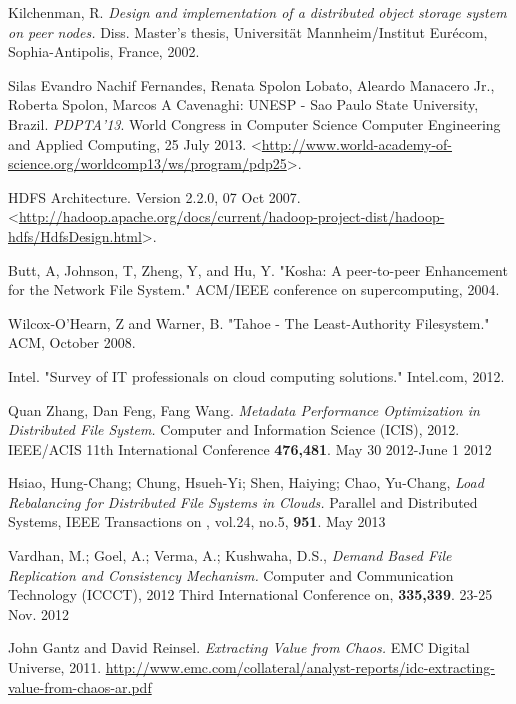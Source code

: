 \documentclass[letterpaper]{article}
\begin{document}
\begin{thebibliography}{99}
Kilchenman, R. \emph{Design and implementation of a distributed object storage system on peer nodes.} Diss. Master’s thesis, Universität Mannheim/Institut Eurécom, Sophia-Antipolis, France, 2002.

Silas Evandro Nachif Fernandes, Renata Spolon Lobato, Aleardo Manacero Jr., Roberta Spolon, Marcos A Cavenaghi: UNESP - Sao Paulo State University, Brazil.
 \emph{PDPTA'13}. World Congress in Computer Science Computer Engineering and Applied Computing, 25 July 2013.
\newblock\textless\url{http://www.world-academy-of-science.org/worldcomp13/ws/program/pdp25}\textgreater .

{HDFS Architecture. Version 2.2.0, 07 Oct 2007.}
\newblock\textless \url{http://hadoop.apache.org/docs/current/hadoop-project-dist/hadoop-hdfs/HdfsDesign.html}\textgreater.  

Butt, A, Johnson, T, Zheng, Y, and Hu, Y. "Kosha: A peer-to-peer Enhancement for the Network File System." ACM/IEEE conference on supercomputing, 2004.

Wilcox-O'Hearn, Z and Warner, B. "Tahoe - The Least-Authority Filesystem." ACM, October 2008.

Intel. "Survey of IT professionals on cloud computing solutions." Intel.com, 2012.

Quan Zhang, Dan Feng, Fang Wang. \emph{Metadata Performance Optimization in Distributed File System.} Computer and Information Science (ICIS), 2012. IEEE/ACIS 11th International Conference \textbf{476,481}. May 30 2012-June 1 2012

    Hsiao, Hung-Chang; Chung, Hsueh-Yi; Shen, Haiying; Chao, Yu-Chang, \emph{Load Rebalancing for Distributed File Systems in Clouds.} Parallel and Distributed Systems, IEEE Transactions on , vol.24, no.5, \textbf{951}. May 2013

Vardhan, M.; Goel, A.; Verma, A.; Kushwaha, D.S., \emph{Demand Based File Replication and Consistency Mechanism.} Computer and Communication Technology (ICCCT), 2012 Third International Conference on, \textbf{335,339}. 23-25 Nov. 2012

John Gantz and David Reinsel. \emph{Extracting Value from Chaos.} EMC Digital Universe, 2011. \url{http://www.emc.com/collateral/analyst-reports/idc-extracting-value-from-chaos-ar.pdf}

\end{thebibliography}
\end{document}

